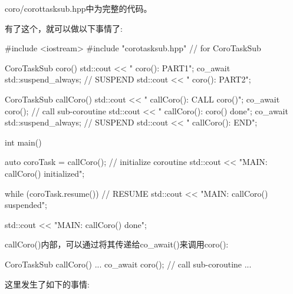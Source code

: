 coro/corottasksub.hpp中为完整的代码。

有了这个，就可以做以下事情了:


\begin{cpp}
#include <iostream>
#include "corotasksub.hpp" // for CoroTaskSub

CoroTaskSub coro()
{
	std::cout << " coro(): PART1\n";
	co_await std::suspend_always{}; // SUSPEND
	std::cout << " coro(): PART2\n";
}

CoroTaskSub callCoro()
{
	std::cout << " callCoro(): CALL coro()\n";
	co_await coro(); // call sub-coroutine
	std::cout << " callCoro(): coro() done\n";
	co_await std::suspend_always{}; // SUSPEND
	std::cout << " callCoro(): END\n";
}

int main()
{
	auto coroTask = callCoro(); // initialize coroutine
	std::cout << "MAIN: callCoro() initialized\n";

	while (coroTask.resume()) { // RESUME
		std::cout << "MAIN: callCoro() suspended\n";
	}

	std::cout << "MAIN: callCoro() done\n";
}
\end{cpp}

callCoro()内部，可以通过将其传递给co\_await()来调用coro():

\begin{cpp}
CoroTaskSub callCoro()
{
	...
	co_await coro(); // call sub-coroutine
	...
}
\end{cpp}

这里发生了如下的事情:

